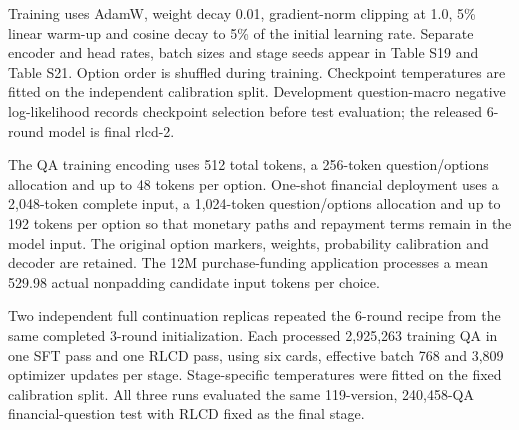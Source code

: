 \documentclass[10pt]{article}
\begin{document}
Training uses AdamW, weight decay 0.01, gradient-norm clipping at 1.0, 5\% linear warm-up and cosine decay to 5\% of the initial learning rate. Separate encoder and head rates, batch sizes and stage seeds appear in Table S19 and Table S21. Option order is shuffled during training. Checkpoint temperatures are fitted on the independent calibration split. Development question-macro negative log-likelihood records checkpoint selection before test evaluation; the released 6-round model is final rlcd-2.

The QA training encoding uses 512 total tokens, a 256-token question/options allocation and up to 48 tokens per option. One-shot financial deployment uses a 2,048-token complete input, a 1,024-token question/options allocation and up to 192 tokens per option so that monetary paths and repayment terms remain in the model input. The original option markers, weights, probability calibration and decoder are retained. The 12M purchase-funding application processes a mean 529.98 actual nonpadding candidate input tokens per choice.

Two independent full continuation replicas repeated the 6-round recipe from the same completed 3-round initialization. Each processed 2,925,263 training QA in one SFT pass and one RLCD pass, using six cards, effective batch 768 and 3,809 optimizer updates per stage. Stage-specific temperatures were fitted on the fixed calibration split. All three runs evaluated the same 119-version, 240,458-QA financial-question test with RLCD fixed as the final stage.
\end{document}
